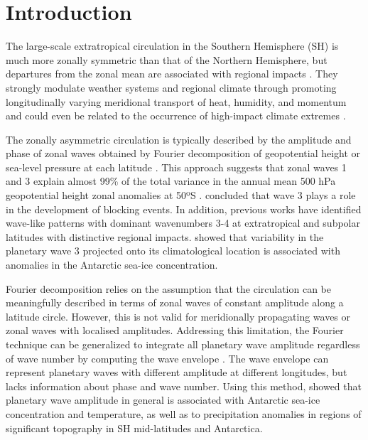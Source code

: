 \documentclass[pdflatex,lineno,sn-basic]{sn-jnl}
\theoremstyle{thmstyleone}%
\theoremstyle{thmstyletwo}%
\theoremstyle{thmstylethree}%
\begin{document}



\maketitle

\hypertarget{introduction}{%
\section{Introduction}\label{introduction}}

The large-scale extratropical circulation in the Southern Hemisphere (SH) is much more zonally symmetric than that of the Northern Hemisphere, but departures from the zonal mean are associated with regional impacts \citep[e.g.][]{hoskins2005}.
They strongly modulate weather systems and regional climate through promoting longitudinally varying meridional transport of heat, humidity, and momentum \citep{trenberth1980a, raphael2007} and could even be related to the occurrence of high-impact climate extremes \citep{pezza2012}.

The zonally asymmetric circulation is typically described by the amplitude and phase of zonal waves obtained by Fourier decomposition of geopotential height or sea-level pressure at each latitude \citep[e.g.][]{vanloon1972, trenberth1980a, turner2017}.
This approach suggests that zonal waves 1 and 3 explain almost 99\% of the total variance in the annual mean 500 hPa geopotential height zonal anomalies at 50ºS \citep{vanloon1972}.
\citet{trenberth1985} concluded that wave 3 plays a role in the development of blocking events.
In addition, previous works have identified wave-like patterns with dominant wavenumbers 3-4 at extratropical and subpolar latitudes with distinctive regional impacts.
\citet{raphael2007} showed that variability in the planetary wave 3 projected onto its climatological location is associated with anomalies in the Antarctic sea-ice concentration.

Fourier decomposition relies on the assumption that the circulation can be meaningfully described in terms of zonal waves of constant amplitude along a latitude circle.
However, this is not valid for meridionally propagating waves or zonal waves with localised amplitudes.
Addressing this limitation, the Fourier technique can be generalized to integrate all planetary wave amplitude regardless of wave number by computing the wave envelope \citep{irving2015}.
The wave envelope can represent planetary waves with different amplitude at different longitudes, but lacks information about phase and wave number.
Using this method, \citet{irving2015} showed that planetary wave amplitude in general is associated with Antarctic sea-ice concentration and temperature, as well as to precipitation anomalies in regions of significant topography in SH mid-latitudes and Antarctica.
\end{document}
